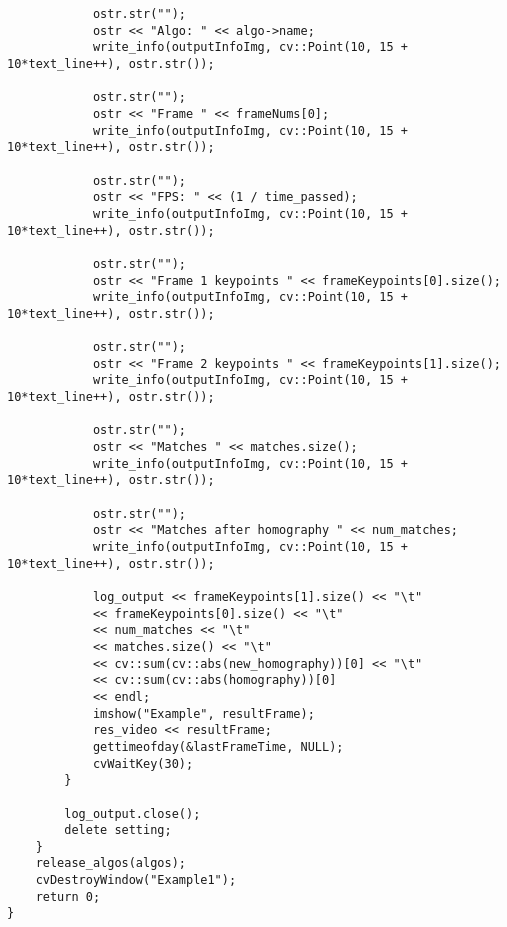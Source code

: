 \begin{lstlisting}
			ostr.str("");
			ostr << "Algo: " << algo->name;
			write_info(outputInfoImg, cv::Point(10, 15 + 10*text_line++), ostr.str());
			
			ostr.str("");
			ostr << "Frame " << frameNums[0];
			write_info(outputInfoImg, cv::Point(10, 15 + 10*text_line++), ostr.str());
			
			ostr.str("");
			ostr << "FPS: " << (1 / time_passed);		
			write_info(outputInfoImg, cv::Point(10, 15 + 10*text_line++), ostr.str());
            
			ostr.str("");
			ostr << "Frame 1 keypoints " << frameKeypoints[0].size();
			write_info(outputInfoImg, cv::Point(10, 15 + 10*text_line++), ostr.str());
			
			ostr.str("");
			ostr << "Frame 2 keypoints " << frameKeypoints[1].size();
			write_info(outputInfoImg, cv::Point(10, 15 + 10*text_line++), ostr.str());
                        
			ostr.str("");
			ostr << "Matches " << matches.size();
			write_info(outputInfoImg, cv::Point(10, 15 + 10*text_line++), ostr.str());
			            
			ostr.str("");
			ostr << "Matches after homography " << num_matches;
			write_info(outputInfoImg, cv::Point(10, 15 + 10*text_line++), ostr.str());
			
			log_output << frameKeypoints[1].size() << "\t"
            << frameKeypoints[0].size() << "\t"
            << num_matches << "\t"
            << matches.size() << "\t"
            << cv::sum(cv::abs(new_homography))[0] << "\t"
            << cv::sum(cv::abs(homography))[0]
            << endl;
			imshow("Example", resultFrame);
            res_video << resultFrame;
			gettimeofday(&lastFrameTime, NULL);
			cvWaitKey(30);
		}
		
		log_output.close();
		delete setting;
	}
	release_algos(algos);
	cvDestroyWindow("Example1");
	return 0;
}
\end{lstlisting}
